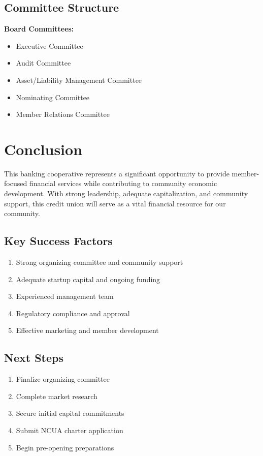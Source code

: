 \documentclass[11pt,letterpaper]{article}
\begin{document}
\subsection{Committee Structure}
\textbf{Board Committees:}
\begin{itemize}[leftmargin=*]
    \item Executive Committee
    \item Audit Committee
    \item Asset/Liability Management Committee
    \item Nominating Committee
    \item Member Relations Committee
\end{itemize}

\section{Conclusion}

This banking cooperative represents a significant opportunity to provide member-focused financial services while contributing to community economic development. With strong leadership, adequate capitalization, and community support, this credit union will serve as a vital financial resource for our community.

\subsection{Key Success Factors}
\begin{enumerate}[leftmargin=*]
    \item Strong organizing committee and community support
    \item Adequate startup capital and ongoing funding
    \item Experienced management team
    \item Regulatory compliance and approval
    \item Effective marketing and member development
\end{enumerate}

\subsection{Next Steps}
\begin{enumerate}[leftmargin=*]
    \item Finalize organizing committee
    \item Complete market research
    \item Secure initial capital commitments
    \item Submit NCUA charter application
    \item Begin pre-opening preparations
\end{enumerate}
\end{document}
